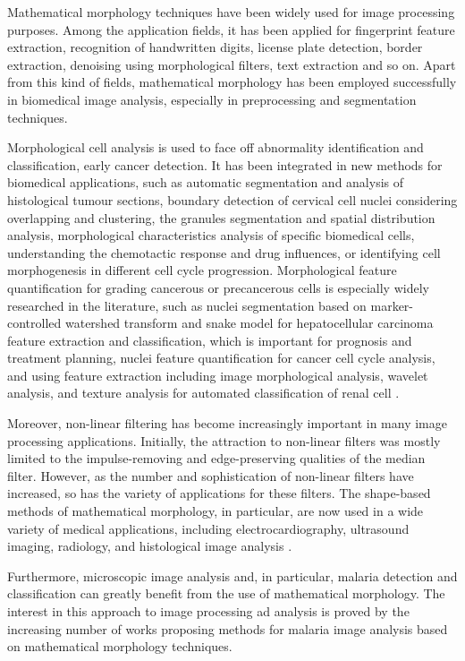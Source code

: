 \documentclass[sensors,review,submit,moreauthors,pdftex,10pt,a4paper]{mdpi}
\begin{document}
Mathematical morphology techniques have been widely used for image processing purposes. Among the application fields, it has been applied for fingerprint feature extraction, recognition of handwritten digits, license plate detection, border extraction, denoising using morphological filters, text extraction and so on. Apart from this kind of fields, mathematical morphology has been employed successfully in biomedical image analysis, especially in preprocessing and segmentation techniques.

Morphological cell analysis is used to face off abnormality identification and classification, early cancer detection. It has been integrated in new methods for biomedical applications, such as automatic segmentation and analysis of histological tumour sections, boundary detection of cervical cell nuclei considering overlapping and clustering, the granules segmentation and spatial distribution analysis, morphological characteristics analysis of specific biomedical cells, understanding the chemotactic response and drug influences, or identifying cell morphogenesis in different cell cycle progression.
Morphological feature quantification for grading cancerous or precancerous cells is especially widely researched in the literature, such as nuclei segmentation based on marker-controlled watershed transform and snake model for hepatocellular carcinoma feature extraction and classification, which is important for prognosis and treatment planning, nuclei feature quantification for cancer cell cycle analysis, and using feature extraction including image morphological analysis, wavelet analysis, and texture analysis for automated classification of renal cell \cite{Chen2012}.

Moreover, non-linear filtering has become increasingly important in many image processing applications. Initially, the attraction to non-linear filters was mostly limited to the impulse-removing and edge-preserving qualities of the median filter. However, as the number and sophistication of non-linear filters have increased, so has the variety of applications for these filters. The shape-based methods of mathematical morphology, in particular, are now used in a wide variety of medical applications, including electrocardiography, ultrasound imaging, radiology, and histological image analysis \cite{Schulze1994}.

Furthermore, microscopic image analysis and, in particular, malaria detection and classification can greatly benefit from the use of mathematical morphology. The interest in this approach to image processing ad analysis is proved by the increasing number of works proposing methods for malaria image analysis based on mathematical morphology techniques.
\end{document}
